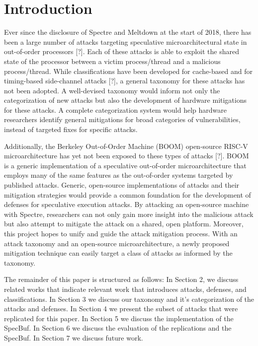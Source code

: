 \section{Introduction}

Ever since the disclosure of Spectre and Meltdown at the start of 2018, there has
been a large number of attacks targeting speculative microarchitectural state in
out-of-order processors [?]. Each of these attacks is able to exploit the shared
state of the processor between a victim process/thread and a malicious process/thread.
While classifications have been developed for cache-based and for timing-based 
side-channel attacks [?], a general taxonomy for these attacks has not been adopted.
A well-devised taxonomy would inform not only the 
categorization of new attacks but also the development of hardware mitigations for 
these attacks. A complete categorization system would help hardware researchers 
identify general mitigations for broad categories of vulnerabilities, instead of 
targeted fixes for specific attacks.

Additionally, the Berkeley Out-of-Order Machine (BOOM) open-source RISC-V
microarchitecture has yet not been exposed to these types of attacks [?]. BOOM
is a generic implementation of a speculative 
out-of-order microarchitecture that employs many of the same features as the 
out-of-order systems targeted by published attacks. Generic, open-source 
implementations of attacks and their mitigation strategies would provide a common 
foundation for the development of defenses for speculative execution attacks.
By attacking an open-source machine with Spectre, researchers can not only gain more 
insight into the malicious attack but also attempt to mitigate the attack on a shared,
open platform. Moreover, this project hopes to unify and guide the attack 
mitigation process. With an attack taxonomy and an open-source microarchitecture, a 
newly proposed mitigation technique can easily target a class of attacks as informed 
by the taxonomy.

The remainder of this paper is structured as follows: In Section 2, we discuss
related works that indicate relevant work that introduces attacks, defenses, and classifications.
In Section 3 we discuss our taxonomy and it's categorization of the attacks and defenses. In
Section 4 we present the subset of attacks that were replicated for this paper. In Section 5
we discuss the implementation of the SpecBuf. In Section 6 we discuss the evaluation of the
replications and the SpecBuf. In Section 7 we discuss future work.
